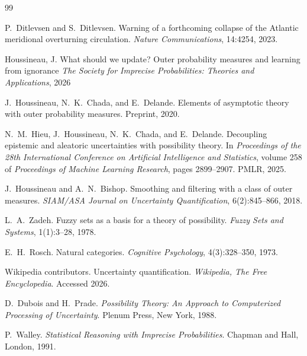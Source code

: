 \documentclass[12pt,a4paper]{article}
\theoremstyle{definition}
\theoremstyle{plain}
\begin{document}
{
\begin{thebibliography}{99}
\small

P.~Ditlevsen and S.~Ditlevsen.
\newblock Warning of a forthcoming collapse of the Atlantic meridional overturning circulation.
\newblock \emph{Nature Communications}, 14:4254, 2023.

Houssineau, J. 
\newblock What should we update? Outer probability measures and learning from ignorance 
\newblock \emph{The Society for Imprecise Probabilities: Theories and Applications}, 2026

J.~Houssineau, N.~K.~Chada, and E.~Delande.
\newblock Elements of asymptotic theory with outer probability measures.
\newblock Preprint, 2020.

N.~M.~Hieu, J.~Houssineau, N.~K.~Chada, and E.~Delande.
\newblock Decoupling epistemic and aleatoric uncertainties with possibility theory.
\newblock In \emph{Proceedings of the 28th International Conference on Artificial Intelligence
and Statistics}, volume 258 of \emph{Proceedings of Machine Learning Research}, pages
2899--2907. PMLR, 2025.

J.~Houssineau and A.~N.~Bishop.
\newblock Smoothing and filtering with a class of outer measures.
\newblock \emph{SIAM/ASA Journal on Uncertainty Quantification}, 6(2):845--866, 2018.

L.~A.~Zadeh.
\newblock Fuzzy sets as a basis for a theory of possibility.
\newblock \emph{Fuzzy Sets and Systems}, 1(1):3--28, 1978.

E.~H.~Rosch.
\newblock Natural categories.
\newblock \emph{Cognitive Psychology}, 4(3):328--350, 1973.

Wikipedia contributors.
\newblock Uncertainty quantification.
\newblock \emph{Wikipedia, The Free Encyclopedia}. Accessed 2026.

D.~Dubois and H.~Prade.
\newblock \emph{Possibility Theory: An Approach to Computerized Processing of Uncertainty}.
\newblock Plenum Press, New York, 1988.

P.~Walley.
\newblock \emph{Statistical Reasoning with Imprecise Probabilities}.
\newblock Chapman and Hall, London, 1991.


\end{thebibliography}}
\end{document}
